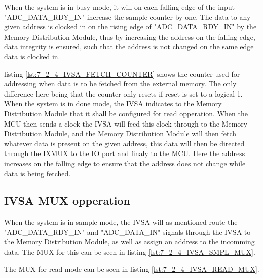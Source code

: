 When the system is in busy mode, it will on each falling edge of the input "ADC\_DATA\_RDY\_IN" increase the sample counter by one. The data to any given address is clocked in on the rising edge of "ADC\_DATA\_RDY\_IN" by the Memory Distribution Module, thus by increasing the address on the falling edge, data integrity is ensured, such that the address is not changed on the same edge data is clocked in.



listing \ref{lst:7_2_4_IVSA_FETCH_COUNTER} shows the counter used for addressing when data is to be fetched from the external memory. The only difference here being that the counter only resets if reset is set to a logical 1. When the system is in done mode, the IVSA indicates to the Memory Distribution Module that it shall be configured for read opperation. When the MCU then sends a clock the IVSA will feed this clock through to the Memory Distribution Module, and the Memory Distribution Module will then fetch whatever data is present on the given address, this data will then be directed through the IXMUX to the IO port and finaly to the MCU. Here the address increases on the falling edge to ensure that the address does not change while data is being fetched. 



\subsection*{IVSA MUX opperation}
When the system is in sample mode, the IVSA will as mentioned route the "ADC\_DATA\_RDY\_IN" and "ADC\_DATA\_IN" signals through the IVSA to the Memory Distribution Module, as well as assign an address to the incomming data. The MUX for this can be seen in listing \ref{lst:7_2_4_IVSA_SMPL_MUX}. 



The MUX for read mode can be seen in listing \ref{lst:7_2_4_IVSA_READ_MUX}.


